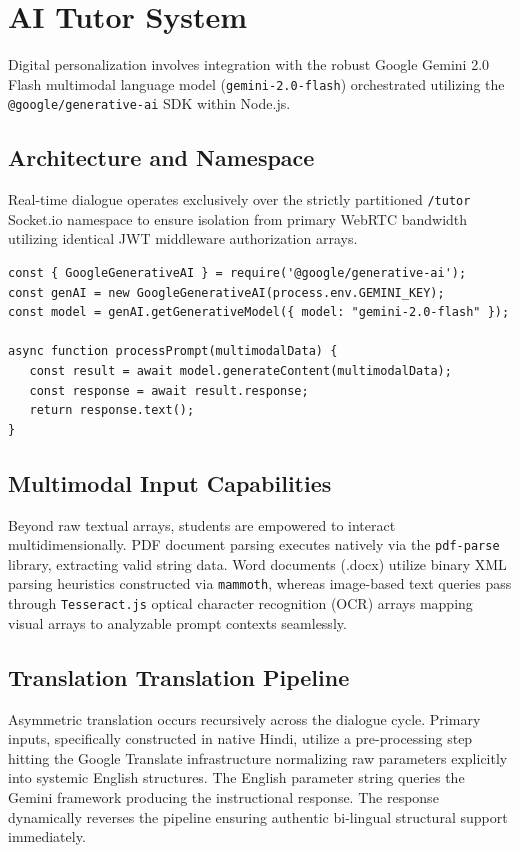\documentclass[12pt, journal, onecolumn]{IEEEtran}
\begin{document}
\section{AI Tutor System}
Digital personalization involves integration with the robust Google Gemini 2.0 Flash multimodal language model (\texttt{gemini-2.0-flash}) orchestrated utilizing the \texttt{@google/generative-ai} SDK within Node.js.

\subsection{Architecture and Namespace}
Real-time dialogue operates exclusively over the strictly partitioned \texttt{/tutor} Socket.io namespace to ensure isolation from primary WebRTC bandwidth utilizing identical JWT middleware authorization arrays.

\begin{lstlisting}[caption=Gemini 2.0 Promisified Integration]
const { GoogleGenerativeAI } = require('@google/generative-ai');
const genAI = new GoogleGenerativeAI(process.env.GEMINI_KEY);
const model = genAI.getGenerativeModel({ model: "gemini-2.0-flash" });

async function processPrompt(multimodalData) {
   const result = await model.generateContent(multimodalData);
   const response = await result.response;
   return response.text();
}
\end{lstlisting}

\subsection{Multimodal Input Capabilities}
Beyond raw textual arrays, students are empowered to interact multidimensionally. PDF document parsing executes natively via the \texttt{pdf-parse} library, extracting valid string data. Word documents (.docx) utilize binary XML parsing heuristics constructed via \texttt{mammoth}, whereas image-based text queries pass through \texttt{Tesseract.js} optical character recognition (OCR) arrays mapping visual arrays to analyzable prompt contexts seamlessly.

\subsection{Translation Translation Pipeline}
Asymmetric translation occurs recursively across the dialogue cycle. Primary inputs, specifically constructed in native Hindi, utilize a pre-processing step hitting the Google Translate infrastructure normalizing raw parameters explicitly into systemic English structures. The English parameter string queries the Gemini framework producing the instructional response. The response dynamically reverses the pipeline ensuring authentic bi-lingual structural support immediately.
\end{document}
